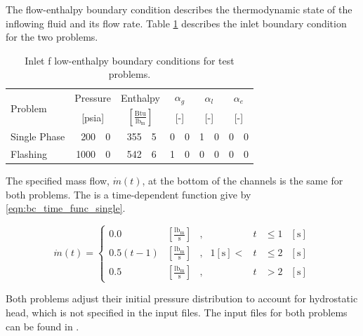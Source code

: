 The flow-enthalpy boundary condition describes the thermodynamic state of the inflowing fluid and its flow rate.
Table \ref{tab:bc_fe} describes the inlet boundary condition for the two problems.

\begin{table}[ht]
\centering
\begin{tabular}{@{}lr@{.}lr@{.}lr@{.}lr@{.}lr@{.}l@{}} \toprule
\multirow{2}{*}{Problem} & \multicolumn{2}{c}{Pressure} & \multicolumn{2}{c}{Enthalpy}             & \multicolumn{2}{c}{$\alpha_g$} & \multicolumn{2}{c}{$\alpha_l$} & \multicolumn{2}{c}{$\alpha_e$} \\ 
                         & \multicolumn{2}{c}{[psia]} & \multicolumn{2}{c}{$[\frac{\text{Btu}}{\text{lb}_{\text{m}}}]$} & \multicolumn{2}{c}{[-]}      & \multicolumn{2}{c}{[-]}      & \multicolumn{2}{c}{[-]}      \\ \midrule
Single Phase             &  200&0                       &  355&5                                   & 0&0                            & 1&0                            & 0&0 \\
Flashing                 & 1000&0                       &  542&6                                   & 1&0                            & 0&0                            & 0&0 \\ \bottomrule  
\end{tabular}
\caption{Inlet f	low-enthalpy boundary conditions for test problems.}
\label{tab:bc_fe}
\end{table}

The specified mass flow, $\dot{m}(t)$, at the bottom of the channels is the same for both problems. 
The is a time-dependent function give by \eqref{eqn:bc_time_func_single}.

\begin{equation}
\label{eqn:bc_time_func_single}
\dot{m}(t) = \left\{
\begin{array}{cclrcll}
 0.0           & [\frac{\text{lb}_{\text{m}}}{\text{s}}] & , &         & t & \leq 1 &[\text{s}] \\
 0.5 ( t - 1)  & [\frac{\text{lb}_{\text{m}}}{\text{s}}] & , & 1 [\text{s}] < & t & \leq 2 &[\text{s}] \\
 0.5           & [\frac{\text{lb}_{\text{m}}}{\text{s}}] & , &         & t & > 2    &[\text{s}]
\end{array}\right.
\end{equation}

Both problems adjust their initial pressure distribution to account for hydrostatic head, which is not specified in the input files.
The \cobra{} input files for both problems can be found in .

